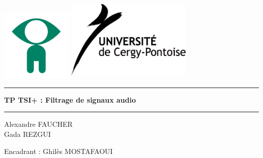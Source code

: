 \begin{titlepage}

\includegraphics {./img/depinfo.png} \includegraphics [width=6cm, height=4cm]{./img/UCP_logo_noir}


\hrule
\begin{center}\huge\bfseries
\color{PineGreen}{}
TP TSI+ : Filtrage de signaux audio
\end{center}
\hrule
{}
\begin{flushleft}
Alexandre FAUCHER \\ Gada REZGUI
\end{flushleft}
\begin{center} 
Encadrant :
Ghilès MOSTAFAOUI

\end{center}
\end{titlepage}